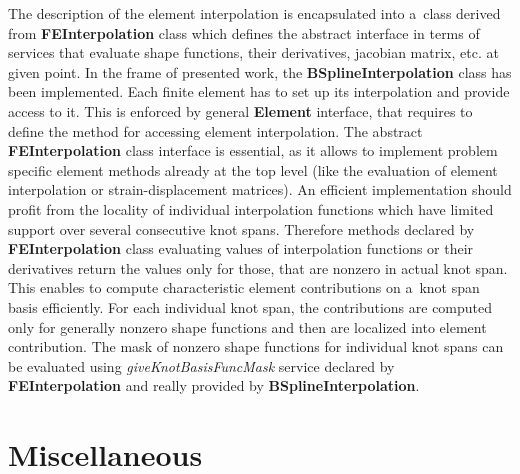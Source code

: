 \documentclass[a4paper]{article}
\newcommand{\class}[1]{{\bf #1}}
\newcommand{\service}[1]{{\em #1}}
\begin{document}
The description of the element interpolation is encapsulated into a~class
derived from \class{FEInterpolation} class which defines the
abstract interface in terms of services that evaluate shape
functions, their derivatives, jacobian matrix, etc. at given
point. In the frame of presented work, the
\class{BSplineInterpolation} class has been implemented.
Each finite element has to set up its
interpolation and provide access to it. This is enforced by general
\class{Element} interface, that requires to define the method for
accessing element interpolation. The abstract \class{FEInterpolation}
class interface is essential, as it allows to implement problem
specific element methods already at the top level (like the evaluation of
element interpolation or strain-displacement matrices). An efficient
implementation should profit from the locality of
individual interpolation functions which have limited support over
several consecutive knot spans. Therefore methods
declared by \class{FEInterpolation} class evaluating values of
interpolation functions or their derivatives return the values
only for those, that are nonzero in actual knot span. This
enables to compute characteristic element contributions on a~knot span
basis efficiently. For each individual knot span, the contributions are
computed only for generally nonzero shape functions and then are
localized into element contribution. The mask of nonzero shape
functions for individual knot spans can be evaluated using
\service{giveKnotBasisFuncMask} service declared by
\class{FEInterpolation} and really provided by \class{BSplineInterpolation}.




\section{Miscellaneous}
\end{document}
